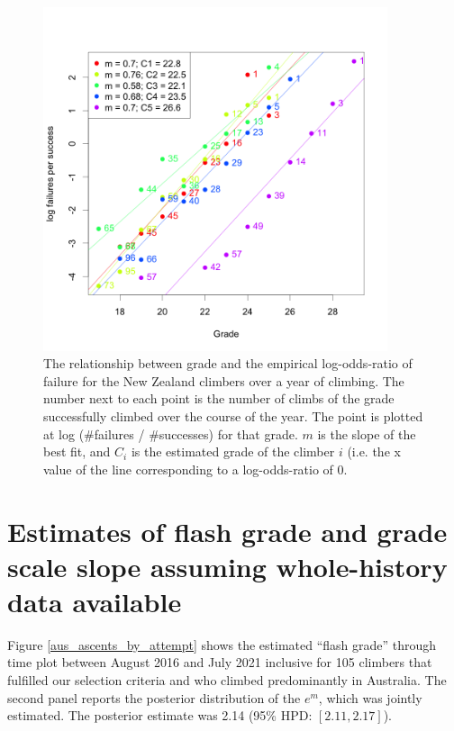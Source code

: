 \documentclass[11pt]{article}
\begin{document}
\begin{figure}
\centering
\includegraphics[width=0.9\textwidth]{../results/nz/ascents-from-2016-08-01-to-2021-08-01-minAscents400-minFails1-session-regression.png}
\caption{\small The relationship between grade and the empirical log-odds-ratio of failure for the New Zealand climbers over a year of climbing. The number next to each point is the number of climbs of the grade successfully climbed over the course of the year. The point is plotted at log (\#failures / \#successes) for that grade. $m$ is the slope of the best fit, and $C_i$ is the estimated grade of the climber $i$ (i.e. the x value of the line corresponding to a log-odds-ratio of 0.}
\label{fig2}
\end{figure}

\section{Estimates of flash grade and grade scale slope assuming whole-history data available}

Figure \ref{aus_ascents_by_attempt} shows the estimated ``flash grade'' through time plot between August 2016 and July 2021 inclusive for 105 climbers that fulfilled our selection criteria and who climbed predominantly in Australia. The second panel reports the posterior distribution of the $e^m$, which was jointly estimated. The posterior estimate was 2.14 (95\% HPD:  $[2.11, 2.17]$).
\end{document}
